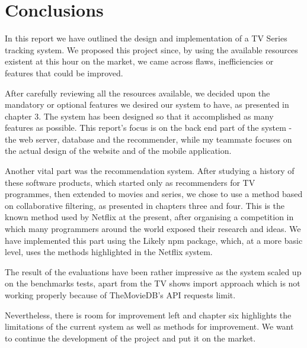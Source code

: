 \chapter{Conclusions}

In this report we have outlined the design and implementation of a TV Series tracking system. We proposed this project since, by using the available resources existent at this hour on the market, we came across flaws, inefficiencies or features that could be improved. 

After carefully reviewing all the resources available, we decided upon the mandatory or optional features we desired our system to have, as presented in chapter 3. The system has been designed so that it accomplished as many features as possible.
This report's focus is on the back end part of the system - the web server, database and the recommender, while my teammate focuses on the actual design of the website and of the mobile application. 

Another vital part was the recommendation system. After studying a history of these software products, which started only as recommenders for TV programmes, then extended to movies and series, we chose to use a method based on collaborative filtering, as presented in chapters three and four. This is the known method used by Netflix at the present, after organising a competition in which many programmers around the world exposed their research and ideas. We have implemented this part using the Likely npm package, which, at a more basic level, uses the methods highlighted in the Netflix system.

The result of the evaluations have been rather impressive as the system scaled up on the benchmarks tests, apart from the TV shows import approach which is not working properly because of TheMovieDB's API requests limit. 

Nevertheless, there is room for improvement left and chapter six highlights the limitations of the current system as well as methods for improvement. We want to continue the development of the project and put it on the market.